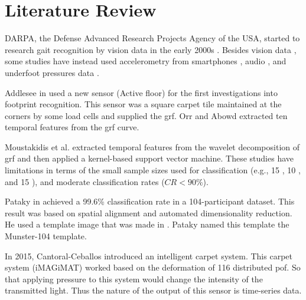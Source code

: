\section{Literature Review}

DARPA, the Defense Advanced Research Projects Agency of the USA, started to research gait recognition by vision data in the early 2000s \cite{Connor2018BiometricFeatures}. Besides vision data \cite{Chen2006GaitModel}, some studies have instead used accelerometry from smartphones \cite{Mantyjarvi2005IdentifyingAccelerometers}, audio \cite{Geiger2013Gait-basedFeatures}, and underfoot pressures data \cite{Nakajima2000Footprint-BasedRecognition}. 







Addlesee in \cite{Addlesee1997TheFloor} used a new sensor (Active floor) for the first investigations into footprint recognition. This sensor was a square carpet tile maintained at the corners by some load cells and supplied the \gls{grf}. Orr and Abowd \cite{Orr2000TheTracking} extracted ten temporal features from the \gls{grf} curve. 

Moustakidis et al. \cite{Moustakidis2008SubjectSignals} extracted temporal features from the wavelet decomposition of \gls{grf} and then applied a kernel-based support vector machine. These studies have limitations in terms of the small sample sizes used for classification (e.g., 15 \cite{Orr2000TheTracking}, 10 \cite{Moustakidis2008SubjectSignals}, and 15 \cite{MiddletonARecognition}), and moderate classification rates ($CR < 90\%$).

Pataky in \cite{Pataky2012GaitIndividuals} achieved a 99.6\% classification rate in a 104-participant dataset. This result was based on spatial alignment and automated dimensionality reduction. He used a template image that was made in \cite{Pataky2011AnEvaluation}. Pataky named this template the Munster-104 template.

In 2015, Cantoral-Ceballos \cite{Cantoral-Ceballos2015IntelligentEnvironments} introduced an intelligent carpet system. This carpet system (iMAGiMAT) worked based on the deformation of 116 distributed \gls{pof}. So that applying pressure to this system would change the intensity of the transmitted light. Thus the nature of the output of this sensor is time-series data.
 
